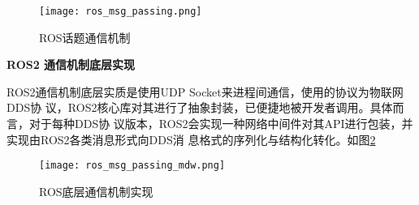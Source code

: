 \begin{figure}[H]
    \centering
    \texttt{[image: ros\_msg\_passing.png]}
    \caption{ROS话题通信机制}
    \label{pic:rmp}
\end{figure}

\textbf{ROS2 通信机制底层实现}

ROS2通信机制底层实质是使用UDP Socket来进程间通信，使用的协议为物联网DDS协
议，ROS2核心库对其进行了抽象封装，已便捷地被开发者调用。具体而言，对于每种DDS协
议版本，ROS2会实现一种网络中间件对其API进行包装，并实现由ROS2各类消息形式向DDS消
息格式的序列化与结构化转化。如图\ref{pic:rmpm}

\begin{figure}[H]
    \centering
    \texttt{[image: ros\_msg\_passing\_mdw.png]}
    \caption{ROS底层通信机制实现}
    \label{pic:rmpm}
\end{figure}